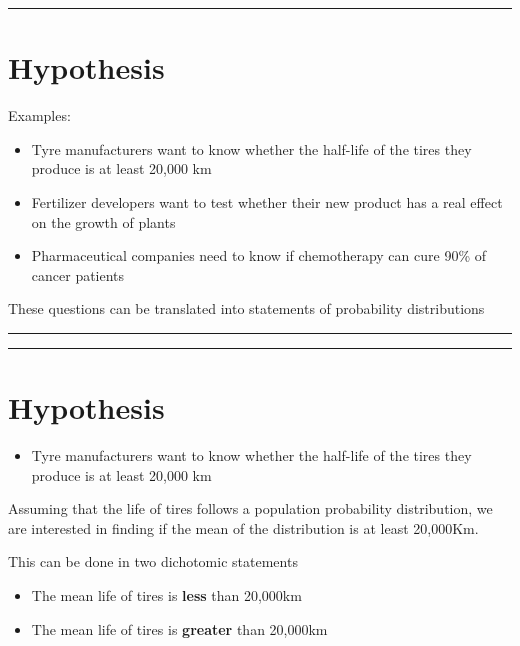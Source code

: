 \documentclass[
]{book}
\providecommand{\tightlist}{%
  \setlength{\itemsep}{0pt}\setlength{\parskip}{0pt}}
\begin{document}
\begin{center}\rule{0.5\linewidth}{0.5pt}\end{center}

\hypertarget{hypothesis-1}{%
\section{Hypothesis}\label{hypothesis-1}}

Examples:

\begin{itemize}
\tightlist
\item
  Tyre manufacturers want to know whether the half-life of the tires they produce is at least 20,000 km
\item
  Fertilizer developers want to test whether their new product has a real effect on the growth of plants
\item
  Pharmaceutical companies need to know if chemotherapy can cure 90\% of cancer patients
\end{itemize}

These questions can be translated into statements of probability distributions

\begin{center}\rule{0.5\linewidth}{0.5pt}\end{center}

\begin{center}\rule{0.5\linewidth}{0.5pt}\end{center}

\hypertarget{hypothesis-2}{%
\section{Hypothesis}\label{hypothesis-2}}

\begin{itemize}
\tightlist
\item
  Tyre manufacturers want to know whether the half-life of the tires they produce is at least 20,000 km
\end{itemize}

Assuming that the life of tires follows a population probability distribution, we are interested in finding if the mean of the distribution is at least 20,000Km.

This can be done in two dichotomic statements

\begin{itemize}
\tightlist
\item
  The mean life of tires is \textbf{less} than 20,000km
\item
  The mean life of tires is \textbf{greater} than 20,000km
\end{itemize}
\end{document}
